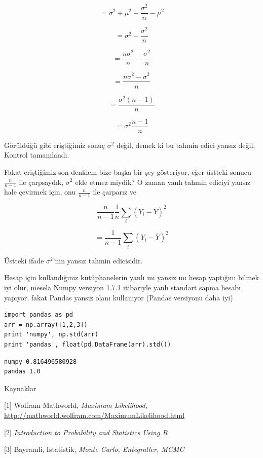 \documentclass[12pt,fleqn]{article}\usepackage{../../common}
\begin{document}
$$ 
=  \sigma^2 + \mu^2 -\frac{\sigma^2}{n} - \mu^2 
$$

$$ 
=  \sigma^2 -\frac{\sigma^2}{n} 
$$

$$ 
=  \frac{n\sigma^2}{n} -\frac{\sigma^2}{n} 
$$


$$ 
=  \frac{n\sigma^2 - \sigma^2}{n} 
$$

$$ 
=  \frac{\sigma^2(n-1)}{n} 
$$

$$ = \sigma^2 \frac{n-1}{n} $$

Görüldüğü gibi eriştiğimiz sonuç $\sigma^2$ değil, demek ki bu tahmin edici
yansız değil. Kontrol tamamlandı.

Fakat eriştiğimiz son denklem bize başka bir şey gösteriyor, eğer üstteki
sonucu $\frac{n}{n-1}$ ile çarpsaydık, $\sigma^2$ elde etmez miydik? O
zaman yanlı tahmin ediciyi yansız hale çevirmek için, onu $\frac{n}{n-1}$
ile çarparız ve

$$ \frac{n}{n-1} \frac{1}{n}\sum_i (Y_i-\bar{Y})^2 $$

$$ =  \frac{1}{n-1}\sum_i (Y_i-\bar{Y})^2 $$

Üstteki ifade $\sigma^2$'nin yansız tahmin edicisidir. 

Hesap için kullandığınız kütüphanelerin yanlı mı yansız mı hesap yaptığını
bilmek iyi olur, mesela Numpy versiyon 1.7.1 itibariyle yanlı standart
sapma hesabı yapıyor, fakat Pandas yansız olanı kullanıyor (Pandas
versiyonu daha iyi)

\begin{verbatim}
import pandas as pd
arr = np.array([1,2,3])
print 'numpy', np.std(arr)
print 'pandas', float(pd.DataFrame(arr).std())
\end{verbatim}

\begin{verbatim}
numpy 0.816496580928
pandas 1.0
\end{verbatim}

Kaynaklar

[1] Wolfram Mathworld, {\em Maximum Likelihood}, \url{http://mathworld.wolfram.com/MaximumLikelihood.html}

[2] {\em Introduction to Probability and Statistics Using R}

[3] Bayramli, Istatistik, {\em Monte Carlo, Entegraller, MCMC}
\end{document}

